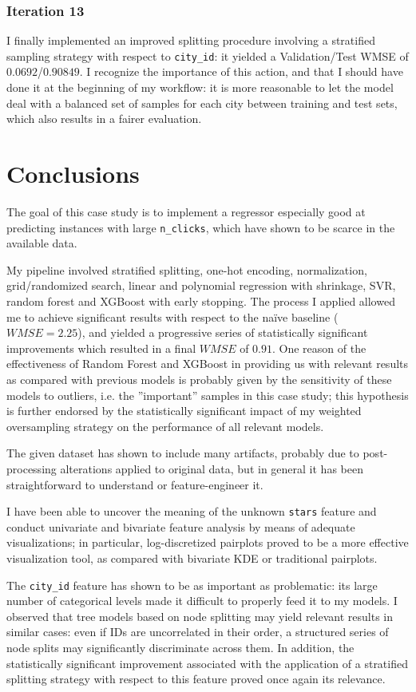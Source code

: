 \documentclass[preprint,12pt,3p]{elsarticle}
\begin{document}
\subsubsection{Iteration 13}
I finally implemented an improved splitting procedure involving a stratified sampling strategy with respect to \verb|city_id|: it yielded a Validation/Test WMSE of $0.0692$/$0.90849$. I recognize the importance of this action, and that I should have done it at the beginning of my workflow: it is more reasonable to let the model deal with a balanced set of samples for each city between training and test sets, which also results in a fairer evaluation.

\section{Conclusions}
The goal of this case study is to implement a regressor especially good at predicting instances with large \verb|n_clicks|, which have shown to be scarce in the available data. 

My pipeline involved stratified splitting, one-hot encoding, normalization, grid/randomized search, linear and polynomial regression with shrinkage, SVR, random forest and XGBoost with early stopping. The process I applied allowed me to achieve significant results with respect to the na\"{i}ve baseline ($WMSE=2.25$), and yielded a progressive series of statistically significant improvements which resulted in a final $WMSE$ of $0.91$. One reason of the effectiveness of Random Forest and XGBoost in providing us with relevant results as compared with previous models is probably given by the sensitivity of these models to outliers, i.e. the ''important'' samples in this case study; this hypothesis is further endorsed by the statistically significant impact of my weighted oversampling strategy on the performance of all relevant models.

The given dataset has shown to include many artifacts, probably due to post-processing alterations applied to original data, but in general it has been straightforward to understand or feature-engineer it.

I have been able to uncover the meaning of the unknown \verb|stars| feature and conduct univariate and bivariate feature analysis by means of adequate visualizations; in particular, log-discretized pairplots proved to be a more effective visualization tool, as compared with bivariate KDE or traditional pairplots.

The \verb|city_id| feature has shown to be as important as problematic: its large number of categorical levels made it difficult to properly feed it to my models. I observed that tree models based on node splitting may yield relevant results in similar cases: even if IDs are uncorrelated in their order, a structured series of node splits may significantly discriminate across them. In addition, the statistically significant improvement associated with the application of a stratified splitting strategy with respect to this feature proved once again its relevance.
\end{document}
